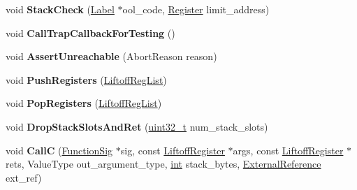 \begin{DoxyCompactItemize}
\item 
\mbox{\label{classv8_1_1internal_1_1wasm_1_1LiftoffAssembler_ae7a1c828fd1a5be4047d7bdfc77c1393}} 
void {\bfseries Stack\+Check} (\mbox{\hyperlink{classv8_1_1internal_1_1Label}{Label}} $\ast$ool\+\_\+code, \mbox{\hyperlink{classv8_1_1internal_1_1Register}{Register}} limit\+\_\+address)
\item 
\mbox{\label{classv8_1_1internal_1_1wasm_1_1LiftoffAssembler_a59de3c0f86eb9deb2855cceec351c7a1}} 
void {\bfseries Call\+Trap\+Callback\+For\+Testing} ()
\item 
\mbox{\label{classv8_1_1internal_1_1wasm_1_1LiftoffAssembler_a75ec0e50dc2bc1370fe1aa3acf754594}} 
void {\bfseries Assert\+Unreachable} (Abort\+Reason reason)
\item 
\mbox{\label{classv8_1_1internal_1_1wasm_1_1LiftoffAssembler_ad161e49b309b399d6927bd80512da532}} 
void {\bfseries Push\+Registers} (\mbox{\hyperlink{classv8_1_1internal_1_1wasm_1_1LiftoffRegList}{Liftoff\+Reg\+List}})
\item 
\mbox{\label{classv8_1_1internal_1_1wasm_1_1LiftoffAssembler_ad98942e9ad79aa0dd1ec068d263e9e50}} 
void {\bfseries Pop\+Registers} (\mbox{\hyperlink{classv8_1_1internal_1_1wasm_1_1LiftoffRegList}{Liftoff\+Reg\+List}})
\item 
\mbox{\label{classv8_1_1internal_1_1wasm_1_1LiftoffAssembler_a8430c1d6833dc4d4148528b2564674cd}} 
void {\bfseries Drop\+Stack\+Slots\+And\+Ret} (\mbox{\hyperlink{classuint32__t}{uint32\+\_\+t}} num\+\_\+stack\+\_\+slots)
\item 
\mbox{\label{classv8_1_1internal_1_1wasm_1_1LiftoffAssembler_adc54961ba954c1967398d8cf6e5b4995}} 
void {\bfseries CallC} (\mbox{\hyperlink{classv8_1_1internal_1_1Signature}{Function\+Sig}} $\ast$sig, const \mbox{\hyperlink{classv8_1_1internal_1_1wasm_1_1LiftoffRegister}{Liftoff\+Register}} $\ast$args, const \mbox{\hyperlink{classv8_1_1internal_1_1wasm_1_1LiftoffRegister}{Liftoff\+Register}} $\ast$rets, Value\+Type out\+\_\+argument\+\_\+type, \mbox{\hyperlink{classint}{int}} stack\+\_\+bytes, \mbox{\hyperlink{classv8_1_1internal_1_1ExternalReference}{External\+Reference}} ext\+\_\+ref)

\end{DoxyCompactItemize}
